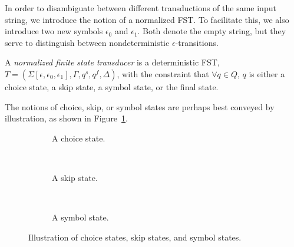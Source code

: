 In order to disambiguate between different transductions of the same input
string, we introduce the notion of a normalized FST. To facilitate this, we
also introduce two new symbols $\epsilon_0$ and $\epsilon_1$. Both denote the
empty string, but they serve to distinguish between nondeterministic
$\epsilon$-transitions.

\begin{definition}[NFST]
  A \emph{normalized finite state transducer} is a deterministic FST,
  $T = (\Sigma[\epsilon,\epsilon_0,\epsilon_1], \Gamma, q^s, q^f, \Delta)$,
  with the constraint that $\forall q \in Q$, $q$ is either a choice state, a
  skip state, a symbol state, or the final state.
\end{definition}

The notions of choice, skip, or symbol states are perhaps best conveyed by
illustration, as shown in Figure~\ref{fig:nfst-states}.

\begin{figure}[!ht]
  \centering
  \begin{subfigure}[b]{0.3\textwidth}
    \centering
    \caption{A choice state.}
  \end{subfigure}
  ~
  \begin{subfigure}[b]{0.3\textwidth}
    \centering
    \caption{A skip state.}
  \end{subfigure}
  ~
  \begin{subfigure}[b]{0.3\textwidth}
    \centering
    \caption{A symbol state.}
  \end{subfigure}
  \caption{Illustration of choice states, skip states, and symbol states.}
  \label{fig:nfst-states}
\end{figure}










